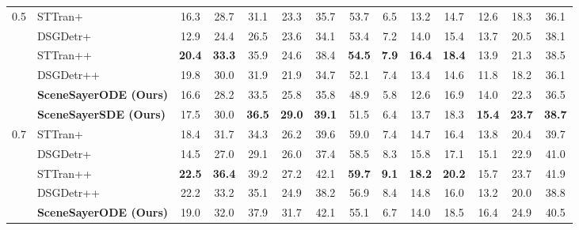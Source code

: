 \begin{table}[!h]
{\begin{tabular}{ll|cccccc|cccccc}
          \cmidrule(lr){2-7} \cmidrule(lr){8-13} 
        \multirow{6}{*}{0.5} &        STTran+ \cite{cong_et_al_sttran_2021} & 16.3 & 28.7 & 31.1 & 23.3 & 35.7 & 53.7 & 6.5 & 13.2 & 14.7 & 12.6 & 18.3 & 36.1  \\ 
        &        DSGDetr+ \cite{Feng_2021} & 12.9 & 24.4 & 26.5 & 23.6 & 34.1 & 53.4 & 7.2 & 14.0 & 15.4 & 13.7 & 20.5 & 38.1  \\ 
        &        STTran++ \cite{cong_et_al_sttran_2021} & \cellcolor{highlightColor} \textbf{20.4} & \cellcolor{highlightColor} \textbf{33.3} & 35.9 & 24.6 & 38.4 & \cellcolor{highlightColor} \textbf{54.5} & \cellcolor{highlightColor} \textbf{7.9} & \cellcolor{highlightColor} \textbf{16.4} & \cellcolor{highlightColor} \textbf{18.4} & 13.9 & 21.3 & 38.5  \\ 
        &        DSGDetr++ \cite{Feng_2021} & 19.8 & 30.0 & 31.9 & 21.9 & 34.7 & 52.1 & 7.4 & 13.4 & 14.6 & 11.8 & 18.2 & 36.1  \\ 
        &        \textbf{SceneSayerODE (Ours)} & 16.6 & 28.2 & 33.5 & 25.8 & 35.8 & 48.9 & 5.8 & 12.6 & 16.9 & 14.0 & 22.3 & 36.5  \\ 
        &        \textbf{SceneSayerSDE (Ours)} & 17.5 & 30.0 & \cellcolor{highlightColor} \textbf{36.5} & \cellcolor{highlightColor} \textbf{29.0} & \cellcolor{highlightColor} \textbf{39.1} & 51.5 & 6.4 & 13.7 & 18.3 & \cellcolor{highlightColor} \textbf{15.4} & \cellcolor{highlightColor} \textbf{23.7} & \cellcolor{highlightColor} \textbf{38.7}  \\ 
          \cmidrule(lr){2-7} \cmidrule(lr){8-13} 
        \multirow{6}{*}{0.7} &        STTran+ \cite{cong_et_al_sttran_2021} & 18.4 & 31.7 & 34.3 & 26.2 & 39.6 & 59.0 & 7.4 & 14.7 & 16.4 & 13.8 & 20.4 & 39.7  \\ 
        &        DSGDetr+ \cite{Feng_2021} & 14.5 & 27.0 & 29.1 & 26.0 & 37.4 & 58.5 & 8.3 & 15.8 & 17.1 & 15.1 & 22.9 & 41.0  \\ 
        &        STTran++ \cite{cong_et_al_sttran_2021} & \cellcolor{highlightColor} \textbf{22.5} & \cellcolor{highlightColor} \textbf{36.4} & 39.2 & 27.2 & 42.1 & \cellcolor{highlightColor} \textbf{59.7} & \cellcolor{highlightColor} \textbf{9.1} & \cellcolor{highlightColor} \textbf{18.2} & \cellcolor{highlightColor} \textbf{20.2} & 15.7 & 23.7 & 41.9  \\ 
        &        DSGDetr++ \cite{Feng_2021} & 22.2 & 33.2 & 35.1 & 24.9 & 38.2 & 56.9 & 8.4 & 14.8 & 16.0 & 13.2 & 20.0 & 38.8  \\ 
        &        \textbf{SceneSayerODE (Ours)} & 19.0 & 32.0 & 37.9 & 31.7 & 42.1 & 55.1 & 6.7 & 14.0 & 18.5 & 16.4 & 24.9 & 40.5  \\ 

\end{tabular}}
\end{table}
